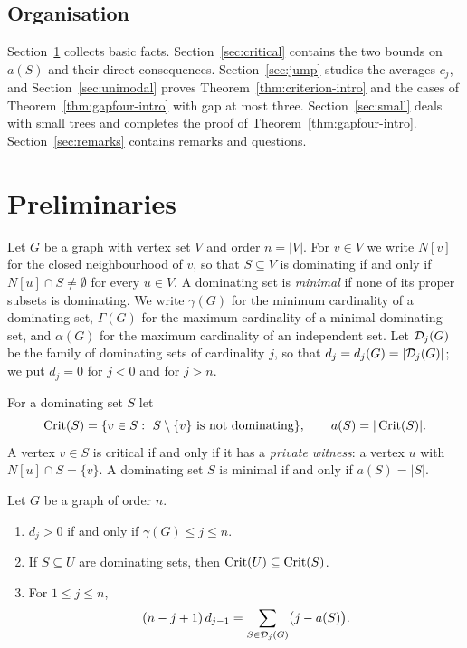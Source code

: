 \subsection*{Organisation}
Section~\ref{sec:prelim} collects basic facts. Section~\ref{sec:critical}
contains the two bounds on $a(S)$ and their direct consequences.
Section~\ref{sec:jump} studies the averages $c_j$, and
Section~\ref{sec:unimodal} proves Theorem~\ref{thm:criterion-intro} and the
cases of Theorem~\ref{thm:gapfour-intro} with gap at most three.
Section~\ref{sec:small} deals with small trees and completes the proof of
Theorem~\ref{thm:gapfour-intro}. Section~\ref{sec:remarks} contains remarks
and questions.

\section{Preliminaries}\label{sec:prelim}

Let $G$ be a graph with vertex set $V$ and order $n=|V|$. For $v\in V$ we
write $N[v]$ for the closed neighbourhood of $v$, so that $S\subseteq V$ is
dominating if and only if $N[u]\cap S\ne\emptyset$ for every $u\in V$. A
dominating set is \emph{minimal} if none of its proper subsets is dominating.
We write $\gamma(G)$ for the minimum cardinality of a dominating set,
$\Gamma(G)$ for the maximum cardinality of a minimal dominating set, and
$\alpha(G)$ for the maximum cardinality of an independent set. Let
$\mathcal{D}_j(G)$ be the family of dominating sets of cardinality $j$, so that
$d_j=d_j(G)=|\mathcal{D}_j(G)|$; we put $d_j=0$ for $j<0$ and for $j>n$.

For a dominating set $S$ let
\[
  \Crit(S)=\{v\in S:\ S\setminus\{v\}\text{ is not dominating}\},\qquad
  a(S)=|\Crit(S)| .
\]
A vertex $v\in S$ is critical if and only if it has a \emph{private witness}:
a vertex $u$ with $N[u]\cap S=\{v\}$. A dominating set $S$ is minimal if and
only if $a(S)=|S|$.

\begin{lemma}\label{lem:basic}
Let $G$ be a graph of order $n$.
\begin{enumerate}
\item[\textup{(i)}] $d_j>0$ if and only if $\gamma(G)\le j\le n$.
\item[\textup{(ii)}] If $S\subseteq U$ are dominating sets, then
$\operatorname{Crit}(U)\subseteq\operatorname{Crit}(S)$.
\item[\textup{(iii)}] For $1\le j\le n$,
\begin{equation}\label{eq:incidence}
  (n-j+1)\,d_{j-1}=\sum_{S\in\mathcal{D}_j(G)}\bigl(j-a(S)\bigr).
\end{equation}
\end{enumerate}
\end{lemma}

